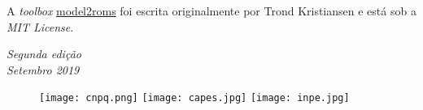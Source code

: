 \noindent A \textit{toolbox} \textcolor{bleu_cite}{\href{https://github.com/trondkr/model2roms}{model2roms}} foi escrita originalmente por 
          Trond Kristiansen e está sob a \textit{MIT License}. 
\bigskip

\noindent \textit{Segunda edição} 
\\ 
\noindent \textit{Setembro 2019} 
\\

\begin{figure}[H]
    \centering
    \vspace*{\fill}
    \texttt{[image: cnpq.png]}
    \hspace{3cm}
    \texttt{[image: capes.jpg]}
    \hspace{3cm}    
    \texttt{[image: inpe.jpg]}
\end{figure}
